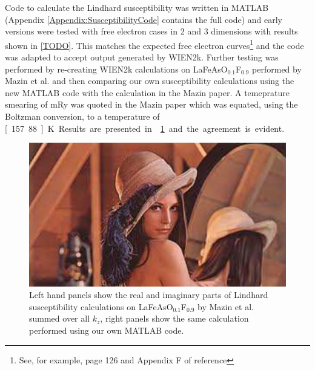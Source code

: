 Code to calculate the Lindhard susceptibility was written in MATLAB (Appendix \ref{Appendix:SusceptibilityCode} contains the full code) and early versions were tested with free electron cases in 2 and 3 dimensions with results shown in \ref{TODO}. This matches the expected free electron curves\footnote{See, for example, page 126 and Appendix F of reference\cite{Dressel2002}} and the code was adapted to accept output generated by WIEN2k. Further testing was performed by re-creating WIEN2k calculations on LaFeAsO$_{0.1}$F$_{0.9}$ performed by Mazin et al.\cite{Mazin2008} and then comparing our own susceptibility calculations using the new MATLAB code with the calculation in the Mazin paper. A temeprature smearing of \unit[1]{mRy} was quoted in the Mazin paper which was equated, using the Boltzman conversion, to a temperature of \unit[157.88]{K}. Results are presented in \fig\ref{Fig:3:MazinX0Comparison} and the agreement is evident.

\begin{figure}[h!]
    \begin{center}
        \includegraphics[scale=0.9]{Misc/TODO}
        \caption{Left hand panels show the real and imaginary parts of Lindhard susceptibility calculations on LaFeAsO$_{0.1}$F$_{0.9}$ by Mazin et al. summed over all $k_z$, right panels show the same calculation performed using our own MATLAB code.}
        \label{Fig:3:MazinX0Comparison}
    \end{center}
\end{figure}

